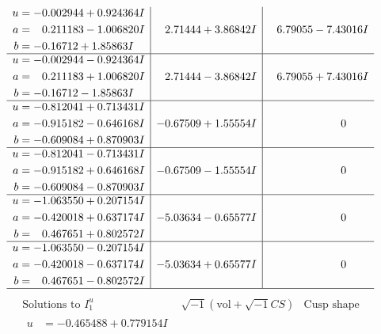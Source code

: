 \documentclass[1p]{elsarticle_modified}
\theoremstyle{definition}
\newcommand{\I}{\sqrt{-1}}
\begin{document}
$$\begin{array}{c|c|c}
\begin{aligned}
u &= -0.002944 + 0.924364 I \\
a &= \phantom{-}0.211183 - 1.006820 I \\
b &= -0.16712 + 1.85863 I\end{aligned}
 & \phantom{-}2.71444 + 3.86842 I & \phantom{-}6.79055 - 7.43016 I \\ \hline\begin{aligned}
u &= -0.002944 - 0.924364 I \\
a &= \phantom{-}0.211183 + 1.006820 I \\
b &= -0.16712 - 1.85863 I\end{aligned}
 & \phantom{-}2.71444 - 3.86842 I & \phantom{-}6.79055 + 7.43016 I \\ \hline\begin{aligned}
u &= -0.812041 + 0.713431 I \\
a &= -0.915182 - 0.646168 I \\
b &= -0.609084 + 0.870903 I\end{aligned}
 & -0.67509 + 1.55554 I & \phantom{-0.000000 } 0 \\ \hline\begin{aligned}
u &= -0.812041 - 0.713431 I \\
a &= -0.915182 + 0.646168 I \\
b &= -0.609084 - 0.870903 I\end{aligned}
 & -0.67509 - 1.55554 I & \phantom{-0.000000 } 0 \\ \hline\begin{aligned}
u &= -1.063550 + 0.207154 I \\
a &= -0.420018 + 0.637174 I \\
b &= \phantom{-}0.467651 + 0.802572 I\end{aligned}
 & -5.03634 - 0.65577 I & \phantom{-0.000000 } 0 \\ \hline\begin{aligned}
u &= -1.063550 - 0.207154 I \\
a &= -0.420018 - 0.637174 I \\
b &= \phantom{-}0.467651 - 0.802572 I\end{aligned}
 & -5.03634 + 0.65577 I & \phantom{-0.000000 } 0\\
 \hline 
 \end{array}$$\newpage$$\begin{array}{c|c|c}  
\text{Solutions to }I^u_{1}& \I (\text{vol} + \sqrt{-1}CS) & \text{Cusp shape}\\
 \hline 
\begin{aligned}
u &= -0.465488 + 0.779154 I \\

\end{aligned}
\end{array}$$
\end{document}
